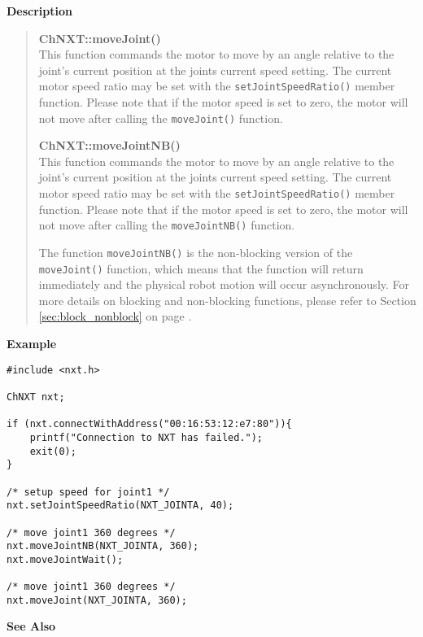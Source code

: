 \noindent
{\bf Description}\\
\vspace{-12pt}
\begin{quote}
{\bf ChNXT::moveJoint()}\\
This function commands the motor to move by an angle relative to 
the joint's current position at the joints current speed setting.
The current motor speed ratio may be set with the 
\texttt{setJointSpeedRatio()} member function. Please note that if
the motor speed is set to zero, the motor will not move after 
calling the \texttt{moveJoint()} function. 

{\bf ChNXT::moveJointNB()}\\
This function commands the motor to move by an angle relative to 
the joint's current position at the joints current speed setting.
The current motor speed ratio may be set with the
\texttt{setJointSpeedRatio()} member function. Please note that if
the motor speed is set to zero, the motor will not move after 
calling the \texttt{moveJointNB()} function. 

The function \texttt{moveJointNB()} is the non-blocking version of
the \texttt{moveJoint()} function, which means that the function 
will return immediately and the physical robot motion will occur 
asynchronously. For more details on blocking and non-blocking 
functions, please refer to Section \ref{sec:block_nonblock} on page 
\pageref{sec:block_nonblock}.\\
\end{quote}

\noindent
{\bf Example}
\begin{lstlisting}
#include <nxt.h> 

ChNXT nxt;

if (nxt.connectWithAddress("00:16:53:12:e7:80")){
    printf("Connection to NXT has failed.");
    exit(0);
}
 
/* setup speed for joint1 */
nxt.setJointSpeedRatio(NXT_JOINTA, 40);

/* move joint1 360 degrees */
nxt.moveJointNB(NXT_JOINTA, 360);
nxt.moveJointWait();

/* move joint1 360 degrees */
nxt.moveJoint(NXT_JOINTA, 360);
\end{lstlisting}

\noindent
{\bf See Also}\\
